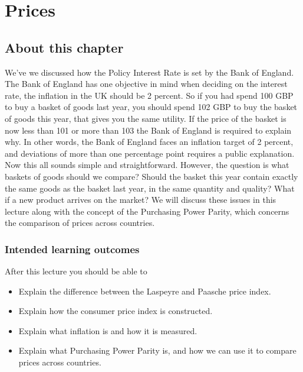 \documentclass[]{book}
\providecommand{\tightlist}{%
  \setlength{\itemsep}{0pt}\setlength{\parskip}{0pt}}
\begin{document}
\hypertarget{prices}{%
\chapter{Prices}\label{prices}}

\hypertarget{about-this-chapter-3}{%
\section{About this chapter}\label{about-this-chapter-3}}

We've we discussed how the Policy Interest Rate is set by the Bank of England. The Bank of England has one objective in mind when deciding on the interest rate, the inflation in the UK should be 2 percent. So if you had spend 100 GBP to buy a basket of goods last year, you should spend 102 GBP to buy the basket of goods this year, that gives you the same utility. If the price of the basket is now less than 101 or more than 103 the Bank of England is required to explain why. In other words, the Bank of England faces an inflation target of 2 percent, and deviations of more than one percentage point requires a public explanation. Now this all sounds simple and straightforward. However, the question is what baskets of goods should we compare? Should the basket this year contain exactly the same goods as the basket last year, in the same quantity and quality? What if a new product arrives on the market? We will discuss these issues in this lecture along with the concept of the Purchasing Power Parity, which concerns the comparison of prices across countries.

\hypertarget{intended-learning-outcomes-3}{%
\subsection{Intended learning outcomes}\label{intended-learning-outcomes-3}}

After this lecture you should be able to

\begin{itemize}
\tightlist
\item
  Explain the difference between the Laspeyre and Paasche price index.
\item
  Explain how the consumer price index is constructed.
\item
  Explain what inflation is and how it is measured.
\item
  Explain what Purchasing Power Parity is, and how we can use it to compare prices across countries.
\end{itemize}
\end{document}
